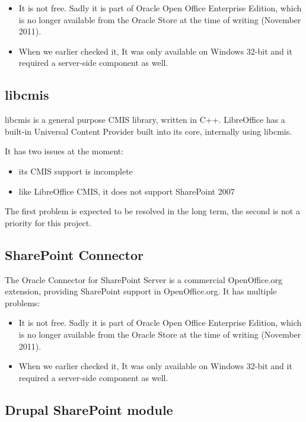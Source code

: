 \begin{itemize}
\item It is not free. Sadly it is part of Oracle Open Office Enterprise
Edition, which is no longer available from the Oracle Store at the time of
writing (November 2011).
\item When we earlier checked it, It was only available on Windows 32-bit and it
required a server-side component as well.
\end{itemize}

\subsection*{libcmis}
libcmis\cite{libcmis} is a general purpose CMIS library, written in C++.
LibreOffice has a built-in Universal Content Provider built into its core,
internally using libcmis.

It has two issues at the moment:

\begin{itemize}
\item its CMIS support is incomplete
\item like LibreOffice CMIS, it does not support SharePoint 2007
\end{itemize}

The first problem is expected to be resolved in the long term, the second is
not a priority for this project.

\subsection*{SharePoint Connector}
The Oracle Connector for SharePoint Server\cite{oracle-sp-connector} is a
commercial OpenOffice.org extension, providing SharePoint support in
OpenOffice.org. It has multiple problems:

\begin{itemize}
\item It is not free. Sadly it is part of Oracle Open Office Enterprise
Edition, which is no longer available from the Oracle Store at the time of
writing (November 2011).
\item When we earlier checked it, It was only available on Windows 32-bit and it
required a server-side component as well.
\end{itemize}

\subsection*{Drupal SharePoint module}

